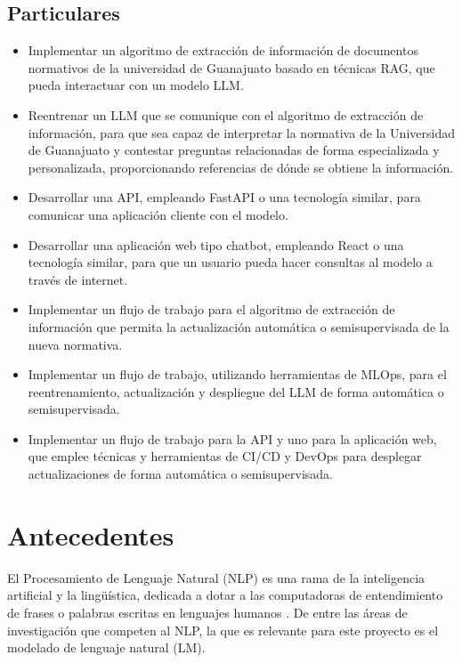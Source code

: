 \subsection{Particulares}

\begin{itemize}
      \item Implementar un algoritmo de extracción de información de documentos
            normativos de la universidad de Guanajuato basado en técnicas RAG, que
            pueda interactuar con un modelo LLM.
      \item Reentrenar un LLM que se comunique con el algoritmo de extracción de
            información, para que sea capaz de interpretar la normativa de la Universidad
            de Guanajuato y contestar preguntas relacionadas de forma especializada y
            personalizada, proporcionando referencias de dónde se obtiene la información.
      \item Desarrollar una API, empleando FastAPI o una tecnología similar,
            para comunicar una aplicación cliente con el modelo.
      \item Desarrollar una aplicación web tipo chatbot, empleando React o una
            tecnología similar, para que un usuario pueda hacer consultas al modelo a
            través de internet.
      \item Implementar un flujo de trabajo para el algoritmo de extracción de
            información que permita la actualización automática o semisupervisada de
            la nueva normativa.
      \item Implementar un flujo de trabajo, utilizando herramientas de MLOps,
            para el reentrenamiento, actualización y despliegue del LLM de forma automática
            o semisupervisada.
      \item Implementar un flujo de trabajo para la API y uno para la aplicación
            web, que emplee técnicas y herramientas de CI/CD y DevOps para desplegar
            actualizaciones de forma automática o semisupervisada.
\end{itemize}


\section{Antecedentes}

El Procesamiento de Lenguaje Natural (NLP) es una rama de la inteligencia artificial
y la lingüística, dedicada a dotar a las computadoras de entendimiento de frases o
palabras escritas en lenguajes humanos \cite{khurana_natural_2023}. De entre las áreas
de investigación que competen al NLP, la que es relevante para este proyecto es
el modelado de lenguaje natural (LM).

